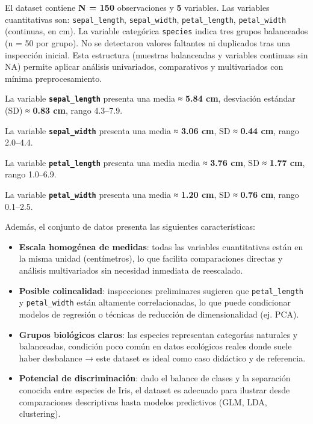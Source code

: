 \documentclass[
  spanish,
  11pt,
  a4paper,
  DIV=11,
  numbers=noendperiod]{scrartcl}
\begin{document}
El dataset contiene \textbf{N = 150} observaciones y \textbf{5}
variables. Las variables cuantitativas son: \texttt{sepal\_length},
\texttt{sepal\_width}, \texttt{petal\_length}, \texttt{petal\_width}
(continuas, en cm). La variable categórica \texttt{species} indica tres
grupos balanceados (n = 50 por grupo). No se detectaron valores
faltantes ni duplicados tras una inspección inicial. Esta estructura
(muestras balanceadas y variables continuas sin NA) permite aplicar
análisis univariados, comparativos y multivariados con mínima
preprocesamiento.

La variable \textbf{\texttt{sepal\_length}} presenta una media ≈
\textbf{5.84 cm}, desviación estándar (SD) ≈ \textbf{0.83 cm}, rango
4.3--7.9.

La variable \textbf{\texttt{sepal\_width}} presenta una media ≈
\textbf{3.06 cm}, SD ≈ \textbf{0.44 cm}, rango 2.0--4.4.

La variable \textbf{\texttt{petal\_length}} presenta una media media ≈
\textbf{3.76 cm}, SD ≈ \textbf{1.77 cm}, rango 1.0--6.9.

La variable \textbf{\texttt{petal\_width}} presenta una media ≈
\textbf{1.20 cm}, SD ≈ \textbf{0.76 cm}, rango 0.1--2.5.

Además, el conjunto de datos presenta las siguientes características:

\begin{itemize}
\item
  \textbf{Escala homogénea de medidas}: todas las variables
  cuantitativas están en la misma unidad (centímetros), lo que facilita
  comparaciones directas y análisis multivariados sin necesidad
  inmediata de reescalado.
\item
  \textbf{Posible colinealidad}: inspecciones preliminares sugieren que
  \texttt{petal\_length} y \texttt{petal\_width} están altamente
  correlacionadas, lo que puede condicionar modelos de regresión o
  técnicas de reducción de dimensionalidad (ej. PCA).
\item
  \textbf{Grupos biológicos claros}: las especies representan categorías
  naturales y balanceadas, condición poco común en datos ecológicos
  reales donde suele haber desbalance → este dataset es ideal como caso
  didáctico y de referencia.
\item
  \textbf{Potencial de discriminación}: dado el balance de clases y la
  separación conocida entre especies de Iris, el dataset es adecuado
  para ilustrar desde comparaciones descriptivas hasta modelos
  predictivos (GLM, LDA, clustering).
\end{itemize}
\end{document}
